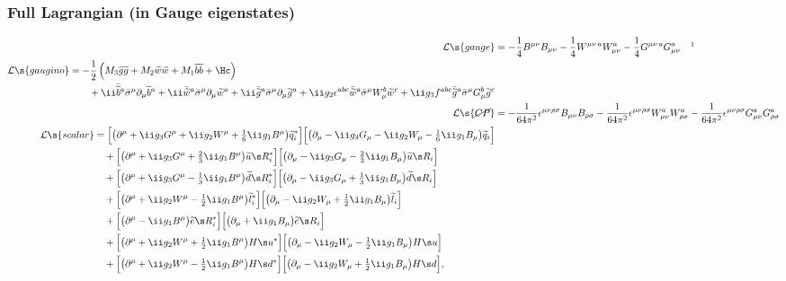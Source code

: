 \subsubsection{Full Lagrangian (in Gauge eigenstates)}
\vspace{-25pt}
\begin{align}
  \Lag\s{gauge}
&=
-\frac14B^{\mu\nu}B_{\mu\nu}
-\frac14W^{\mu\nu\,a}W_{\mu\nu}^a
-\frac14G^{\mu\nu\,a}G_{\mu\nu}^a\quad\footnotemark
\\
\begin{split}
 \Lag\s{gaugino}&=
-\frac12\left(M_3 \gno\gno + M_2 \wno\wno + M_1 \bno\bno + \Hc\right)
\\&\qquad
+ \ii\bbno{}^a\bSm\Pm \bno^a 
+ \ii\bwno{}^a\bSm\Pm \wno^a 
+ \ii\bgno{}^a\bSm\Pm \gno^a 
+
\ii g_2\epsilon^{abc}\bwno{}^a\bSm W_\mu^b \wno{}^c
+
\ii g_3f^{abc}\bgno{}^a\bSm G_\mu^b \gno{}^c
\end{split}
\\
\Lag\s{\cancel{CP}}
&=
-\frac1{64\pi^2}\epsilon^{\mu\nu\rho\sigma}B_{\mu\nu}B_{\rho\sigma}
-\frac1{64\pi^2}\epsilon^{\mu\nu\rho\sigma}W^a_{\mu\nu}W_{\rho\sigma}^a
-\frac1{64\pi^2}\epsilon^{\mu\nu\rho\sigma}G^a_{\mu\nu}G_{\rho\sigma}^a
\\
\begin{split}
\Lag\s{scalar} &=
           \Bigl[\bigl(\partial^\mu+\ii g_3G^\mu+\ii g_2W^\mu+\tfrac16\ii g_1B^\mu\bigr)\sqL_i^*\Bigr]\Bigl[\bigl(\partial_\mu-\ii g_3G_\mu-\ii g_2W_\mu-\tfrac16\ii g_1B_\mu\bigr)\tilde q_i\Bigr]
\\&\quad + \Bigl[\bigl(\partial^\mu+\ii g_3G^\mu+\tfrac23\ii g_1B^\mu\bigr)\suR{}_i^*\Bigr]\Bigl[\bigl(\partial_\mu-\ii g_3G_\mu-\tfrac23\ii g_1B_\mu\bigr)\tilde \uR_i\Bigr]
\\&\quad + \Bigl[\bigl(\partial^\mu+\ii g_3G^\mu-\tfrac13\ii g_1B^\mu\bigr)\sdR{}_i^*\Bigr]\Bigl[\bigl(\partial_\mu-\ii g_3G_\mu+\tfrac13\ii g_1B_\mu\bigr)\tilde \dR_i\Bigr]
\\&\quad + \Bigl[\bigl(\partial^\mu+\ii g_2W^\mu-\tfrac12\ii g_1B^\mu\bigr)\slL  _i^*\Bigr]\Bigl[\bigl(\partial_\mu-\ii g_2W_\mu+\tfrac12\ii g_1B_\mu\bigr)\tilde l_i\Bigr]
\\&\quad + \Bigl[\bigl(\partial^\mu-\ii g_1B^\mu                     \bigr)\seR{}_i^*\Bigr]\Bigl[\bigl(\partial_\mu+\ii g_1B_\mu\bigr)\tilde \eR_i\Bigr]
\\&\quad + \Bigl[\bigl(\partial^\mu+\ii g_2W^\mu+\tfrac12\ii g_1B^\mu\bigr)\Hu^*     \Bigr]\Bigl[\bigl(\partial_\mu-\ii g_2W_\mu-\tfrac12\ii g_1B_\mu\bigr)\Hu\Bigr]
\\&\quad + \Bigl[\bigl(\partial^\mu+\ii g_2W^\mu-\tfrac12\ii g_1B^\mu\bigr)\Hd^*     \Bigr]\Bigl[\bigl(\partial_\mu-\ii g_2W_\mu+\tfrac12\ii g_1B_\mu\bigr)\Hd\Bigr],

\end{split}
\end{align}
